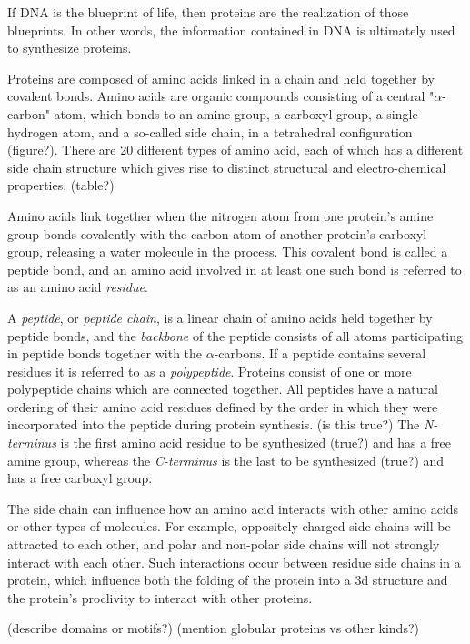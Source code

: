 If DNA is the blueprint of life, then proteins are the realization of those blueprints.
In other words, the information contained in DNA is ultimately used to synthesize proteins.

Proteins are composed of amino acids linked in a chain and held together by covalent bonds.
Amino acids are organic compounds consisting of a central "$\alpha$-carbon" atom, which bonds to an amine group, a carboxyl group, a single hydrogen atom, and a so-called side chain, in a tetrahedral configuration (figure?).
There are 20 different types of amino acid, each of which has a different side chain structure which gives rise to distinct structural and electro-chemical properties. (table?)

Amino acids link together when the nitrogen atom from one protein's amine group bonds covalently with the carbon atom of another protein's carboxyl group, releasing a water molecule in the process.
This covalent bond is called a peptide bond, and an amino acid involved in at least one such bond is referred to as an amino acid \textit{residue}.

A \textit{peptide}, or \textit{peptide chain}, is a linear chain of amino acids held together by peptide bonds, and the \textit{backbone} of the peptide consists of all atoms participating in peptide bonds together with the $\alpha$-carbons.
If a peptide contains several residues it is referred to as a \textit{polypeptide}.
Proteins consist of one or more polypeptide chains which are connected together.
All peptides have a natural ordering of their amino acid residues defined by the order in which they were incorporated into the peptide during protein synthesis. (is this true?)
The \textit{N-terminus} is the first amino acid residue to be synthesized (true?) and has a free amine group, whereas the \textit{C-terminus} is the last to be synthesized (true?) and has a free carboxyl group. 


The side chain can influence how an amino acid interacts with other amino acids or other types of molecules. For example, oppositely charged side chains will be attracted to each other, and polar and non-polar side chains will not strongly interact with each other. 
Such interactions occur between residue side chains in a protein, which influence both the folding of the protein into a 3d structure and the protein’s proclivity to interact with other proteins.

(describe domains or motifs?)
(mention globular proteins vs other kinds?)


